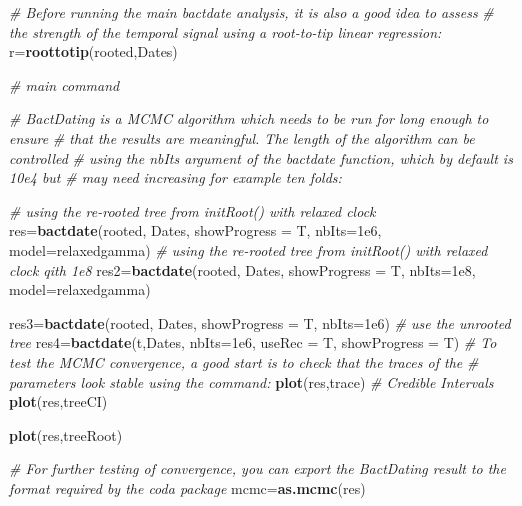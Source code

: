 \documentclass[
]{book}
\newenvironment{Shaded}{\begin{snugshade}}{\end{snugshade}}
\newcommand{\AttributeTok}[1]{\textcolor[rgb]{0.13,0.29,0.53}{#1}}
\newcommand{\CommentTok}[1]{\textcolor[rgb]{0.56,0.35,0.01}{\textit{#1}}}
\newcommand{\FloatTok}[1]{\textcolor[rgb]{0.00,0.00,0.81}{#1}}
\newcommand{\FunctionTok}[1]{\textcolor[rgb]{0.13,0.29,0.53}{\textbf{#1}}}
\newcommand{\NormalTok}[1]{#1}
\newcommand{\OtherTok}[1]{\textcolor[rgb]{0.56,0.35,0.01}{#1}}
\newcommand{\StringTok}[1]{\textcolor[rgb]{0.31,0.60,0.02}{#1}}
\begin{document}
\begin{Shaded}
\begin{Highlighting}[]
\CommentTok{\# Before running the main bactdate analysis, it is also a good idea to assess}
\CommentTok{\# the strength of the temporal signal using a root{-}to{-}tip linear regression:}
\NormalTok{r}\OtherTok{=}\FunctionTok{roottotip}\NormalTok{(rooted,Dates)}

\CommentTok{\# main command}

\CommentTok{\# BactDating is a MCMC algorithm which needs to be run for long enough to ensure}
\CommentTok{\# that the results are meaningful. The length of the algorithm can be controlled}
\CommentTok{\# using the nbIts argument of the bactdate function, which by default is 10e4 but}
\CommentTok{\# may need increasing for example ten folds:}

\CommentTok{\# using the re{-}rooted tree from initRoot() with relaxed clock}
\NormalTok{res}\OtherTok{=}\FunctionTok{bactdate}\NormalTok{(rooted, Dates, }\AttributeTok{showProgress =}\NormalTok{ T, }\AttributeTok{nbIts=}\FloatTok{1e6}\NormalTok{, }\AttributeTok{model=}\StringTok{\textquotesingle{}relaxedgamma\textquotesingle{}}\NormalTok{)}
\CommentTok{\# using the re{-}rooted tree from initRoot() with relaxed clock qith 1e8}
\NormalTok{res2}\OtherTok{=}\FunctionTok{bactdate}\NormalTok{(rooted, Dates, }\AttributeTok{showProgress =}\NormalTok{ T, }\AttributeTok{nbIts=}\FloatTok{1e8}\NormalTok{, }\AttributeTok{model=}\StringTok{\textquotesingle{}relaxedgamma\textquotesingle{}}\NormalTok{)}

\NormalTok{res3}\OtherTok{=}\FunctionTok{bactdate}\NormalTok{(rooted, Dates, }\AttributeTok{showProgress =}\NormalTok{ T, }\AttributeTok{nbIts=}\FloatTok{1e6}\NormalTok{)}
\CommentTok{\# use the unrooted tree}
\NormalTok{res4}\OtherTok{=}\FunctionTok{bactdate}\NormalTok{(t,Dates, }\AttributeTok{nbIts=}\FloatTok{1e6}\NormalTok{, }\AttributeTok{useRec =}\NormalTok{ T, }\AttributeTok{showProgress =}\NormalTok{ T)}
\CommentTok{\# To test the MCMC convergence, a good start is to check that the traces of the}
\CommentTok{\# parameters look stable using the command:}
\FunctionTok{plot}\NormalTok{(res,}\StringTok{\textquotesingle{}trace\textquotesingle{}}\NormalTok{)}
\CommentTok{\# Credible Intervals}
\FunctionTok{plot}\NormalTok{(res,}\StringTok{\textquotesingle{}treeCI\textquotesingle{}}\NormalTok{)}

\FunctionTok{plot}\NormalTok{(res,}\StringTok{\textquotesingle{}treeRoot\textquotesingle{}}\NormalTok{)}

\CommentTok{\# For further testing of convergence, you can export the BactDating result to the format required by the coda package}
\NormalTok{mcmc}\OtherTok{=}\FunctionTok{as.mcmc}\NormalTok{(res)}


\end{Highlighting}
\end{Shaded}
\end{document}
